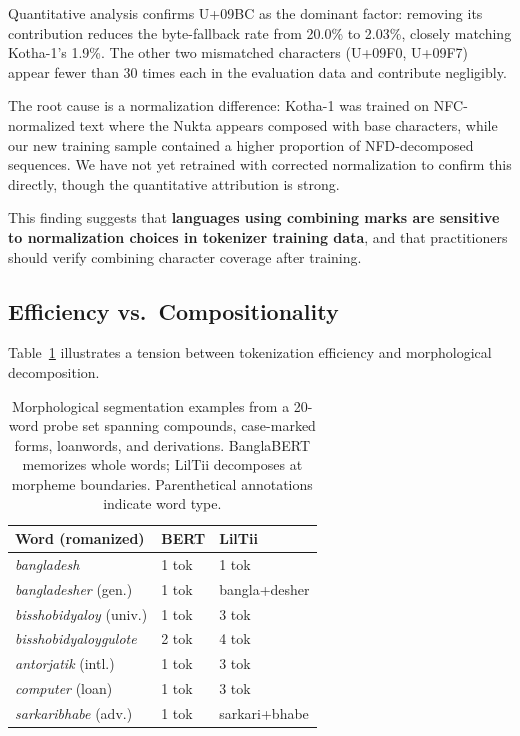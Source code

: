 \documentclass[11pt,a4paper]{article}
\begin{document}
Quantitative analysis confirms U+09BC as the dominant factor: removing its contribution reduces the byte-fallback rate from 20.0\% to 2.03\%, closely matching Kotha-1's 1.9\%.
The other two mismatched characters (U+09F0, U+09F7) appear fewer than 30 times each in the evaluation data and contribute negligibly.

The root cause is a normalization difference: Kotha-1 was trained on NFC-normalized text where the Nukta appears composed with base characters, while our new training sample contained a higher proportion of NFD-decomposed sequences.
We have not yet retrained with corrected normalization to confirm this directly, though the quantitative attribution is strong.

This finding suggests that \textbf{languages using combining marks are sensitive to normalization choices in tokenizer training data}, and that practitioners should verify combining character coverage after training.

\subsection{Efficiency vs.\ Compositionality}

Table~\ref{tab:probes} illustrates a tension between tokenization efficiency and morphological decomposition.

\begin{table}[h]
\centering
\small
\setlength{\tabcolsep}{3pt}
\begin{tabular}{@{}lll@{}}
\toprule
\textbf{Word (romanized)} & \textbf{BERT} & \textbf{LilTii} \\
\midrule
\textit{bangladesh} & 1 tok & 1 tok \\
\textit{bangladesher} (gen.) & 1 tok & bangla+desher \\
\textit{bisshobidyaloy} (univ.) & 1 tok & 3 tok \\
\textit{bisshobidyaloygulote} & 2 tok & 4 tok \\
\textit{antorjatik} (intl.) & 1 tok & 3 tok \\
\textit{computer} (loan) & 1 tok & 3 tok \\
\textit{sarkaribhabe} (adv.) & 1 tok & sarkari+bhabe \\
\bottomrule
\end{tabular}
\caption{Morphological segmentation examples from a 20-word probe set spanning compounds, case-marked forms, loanwords, and derivations. BanglaBERT memorizes whole words; LilTii decomposes at morpheme boundaries. Parenthetical annotations indicate word type.}
\label{tab:probes}
\end{table}
\end{document}
